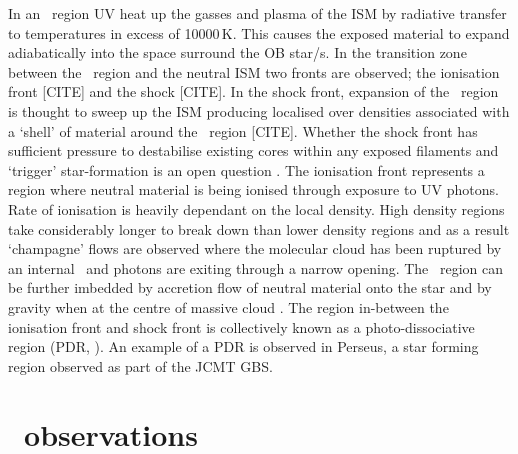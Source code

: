 In an \HII\ region UV heat up the gasses and plasma of the ISM by radiative transfer to temperatures in excess of 10000\,K. This causes the exposed material to expand adiabatically into the space surround the OB star/s. In the transition zone between the \HII\ region and the neutral ISM two fronts are observed; the ionisation front [CITE] and the shock [CITE]. In the shock front, expansion of the \HII\ region is thought to sweep up the ISM producing localised over densities associated with a `shell' of material around the \HII\ region [CITE]. Whether the shock front has sufficient pressure to destabilise existing cores within any exposed filaments and `trigger' star-formation is an open question \citep{Lefloch:1994uq, Urquhart:2009dq}. The ionisation front represents a region where neutral material is being ionised through exposure to UV photons. Rate of ionisation is heavily dependant on the local density. High density regions take considerably longer to break down than lower density regions and as a result `champagne' flows \citep{Dale:2012fk} are observed where the molecular cloud has been ruptured by an internal \HII\ and photons are exiting through a narrow opening. The \HII\ region can be further imbedded by accretion flow of neutral material onto the star \cite{Dale:2005kx, Dale:2011vn} and by gravity when at the centre of massive cloud \cite{Yorke:1989ys}. The region in-between the ionisation front and shock front is collectively known as a photo-dissociative region (PDR, \citeauthor{Thompson:2004uq} \citeyear{Thompson:2004uq}). An example of a PDR is observed in Perseus, a star forming region observed as part of the JCMT GBS.   

\section{\UCHII\ observations}

